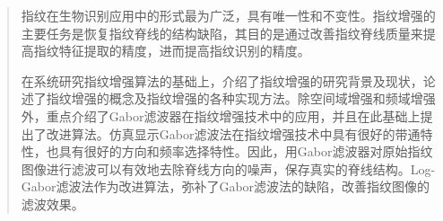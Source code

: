 %
%

\begin{abstract}
    
指纹在生物识别应用中的形式最为广泛，具有唯一性和不变性。指纹增强的主要任务是恢复指纹脊线的结构缺陷，其目的是通过改善指纹脊线质量来提高指纹特征提取的精度，进而提高指纹识别的精度。

在系统研究指纹增强算法的基础上，介绍了指纹增强的研究背景及现状，论述了指纹增强的概念及指纹增强的各种实现方法。除空间域增强和频域增强外，重点介绍了Gabor滤波器在指纹增强技术中的应用，并且在此基础上提出了改进算法。仿真显示Gabor滤波法在指纹增强技术中具有很好的带通特性，也具有很好的方向和频率选择特性。因此，用Gabor滤波器对原始指纹图像进行滤波可以有效地去除脊线方向的噪声，保存真实的脊线结构。Log-Gabor滤波法作为改进算法，弥补了Gabor滤波法的缺陷，改善指纹图像的滤波效果。

\end{abstract}


